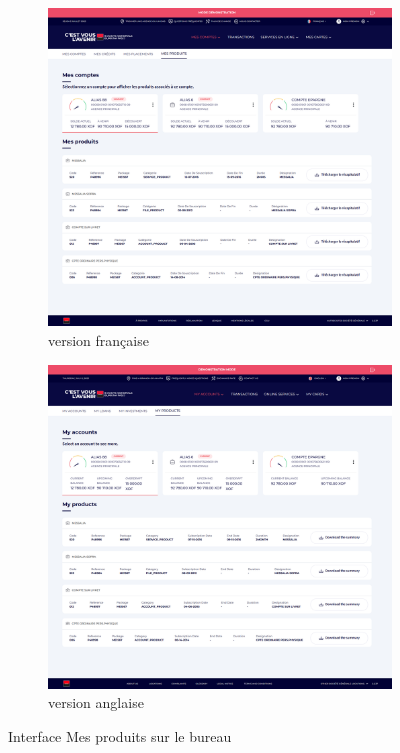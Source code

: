 \begin{figure}[!ht]
    \centering
    \begin{subfigure}[b]{0.49\textwidth}
        \centering
        \includegraphics[width=\textwidth]{images/screens/produits/desktop.png}
        \caption{version française}
    \end{subfigure}
    \hfill
    \begin{subfigure}[b]{0.49\textwidth}
        \centering
        \includegraphics[width=\textwidth]{images/screens/products/desktop.png}
        \caption{version anglaise}
    \end{subfigure}
       \caption{Interface Mes produits sur le bureau}
\end{figure}
\newpage

